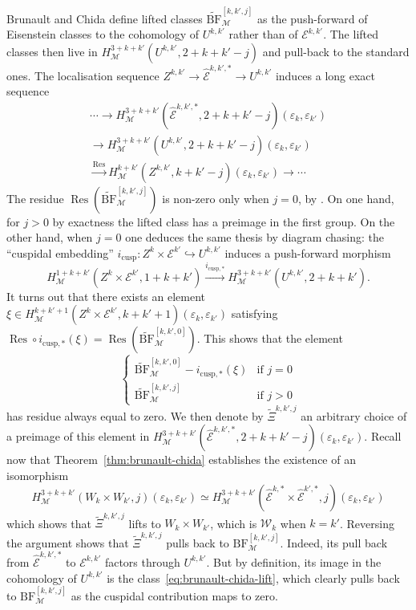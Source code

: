 \documentclass[11pt, a4paper, reqno]{amsart}
\theoremstyle{definition}
\theoremstyle{plain}
\theoremstyle{remark}
\DeclareMathOperator{\Res}{Res}
\DeclareMathOperator{\mot}{\mathscr{M}}
\renewcommand{\epsilon}{\varepsilon}
\newcommand{\Ell}{\mathcal{E}}
\newcommand{\KS}{\mathscr{W}}
\newcommand{\BF}{\mathrm{BF}}
\newcommand{\lBF}{\widetilde{\mathrm{BF}}}
\newcommand{\lcBF}{\widetilde{\Xi}}
\begin{document}
Brunault and Chida define lifted classes $\lBF^{[k,k',j]}_{\mot}$ as the push-forward of Eisenstein classes to the cohomology of $U^{k,k'}$ rather than of $\Ell^{k,k'}$. The lifted classes then live in $H^{3+k+k'}_{\mot}(U^{k,k'},2+k+k'-j)$ and pull-back to the standard ones. The localisation sequence $Z^{k,k'} \to \hat{\Ell}^{k,k',*} \to U^{k,k'}$ induces a long exact sequence
\begin{multline*}
    \cdots\to H^{3+k+k'}_{\mot}(\hat{\Ell}^{k,k',*},2+k+k'-j)(\epsilon_k,\epsilon_{k'}) \\
    \to H^{3+k+k'}_{\mot}(U^{k,k'},2+k+k'-j)(\epsilon_k,\epsilon_{k'}) \\
    \xrightarrow{\Res} H^{k+k'}_{\mot}(Z^{k,k'},k+k'-j)(\epsilon_k,\epsilon_{k'}) \to\cdots
\end{multline*}
The residue $\Res(\lBF^{[k,k',j]}_{\mot})$ is non-zero only when $j=0$, by \cite[Proposition 8.1]{brunaultchida16}. On one hand, for $j>0$ by exactness the lifted class has a preimage in the first group. On the other hand, when $j=0$ one deduces the same thesis by diagram chasing: the ``cuspidal embedding'' $i_{\mathrm{cusp}} \colon Z^k \times \Ell^{k'} \hookrightarrow U^{k,k'}$ induces a push-forward morphism
\[
    H^{1+k+k'}_{\mot}(Z^k \times \Ell^{k'}, 1+k+k') \xrightarrow{i_{\mathrm{cusp},*}} H^{3+k+k'}_{\mot}(U^{k,k'},2+k+k').
\]
It turns out that there exists an element $\xi \in H^{k+k'+1}_{\mot}(Z^k \times \Ell^{k'}, k+k'+1)(\epsilon_k,\epsilon_{k'})$ satisfying $\Res\circ i_{\mathrm{cusp},*}(\xi) = \Res(\lBF^{[k,k',0]}_{\mot})$. This shows that the element
\begin{equation}
 \label{eq:brunault-chida-lift}
 \begin{cases} \lBF^{[k,k',0]}_{\mot} - i_{\mathrm{cusp},*}(\xi) &\text{if $j=0$}\\ \lBF^{[k,k',j]}_{\mot} &\text{if $j>0$} \end{cases} \tag{$\sharp$}
\end{equation}
has residue always equal to zero. We then denote by $\lcBF^{k,k',j}$ an arbitrary choice of a preimage of this element in $H^{3+k+k'}_{\mot}(\hat{\Ell}^{k,k',*},2+k+k'-j)(\epsilon_k,\epsilon_{k'})$. Recall now that Theorem~\ref{thm:brunault-chida} establishes the existence of an isomorphism
\[
    H_{\mot}^{3+k+k'}(W_k \times W_{k'}, j)(\epsilon_k,\epsilon_{k'}) \simeq H_{\mot}^{3+k+k'}(\hat{\Ell}^{k,*} \times \hat{\Ell}^{k',*}, j)(\epsilon_k,\epsilon_{k'})
\]
which shows that $\lcBF^{k,k',j}$ lifts to $W_k\times W_{k'}$, which is $\KS_k$ when $k=k'$. Reversing the argument shows that $\lcBF^{k,k',j}$ pulls back to $\BF^{[k,k',j]}_{\mot}$. Indeed, its pull back from $\hat{\Ell}^{k,k',*}$ to $\Ell^{k,k'}$ factors through $U^{k,k'}$. But by definition, its image in the cohomology of $U^{k,k'}$ is the class~\eqref{eq:brunault-chida-lift}, which clearly pulls back to $\BF^{[k,k',j]}_{\mot}$ as the cuspidal contribution maps to zero.
\end{document}
